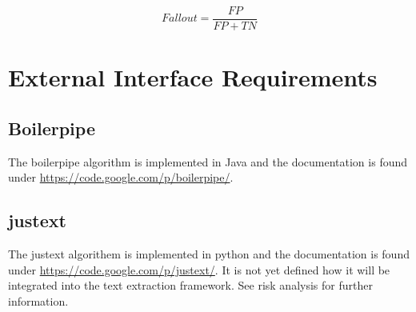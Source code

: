 \begin{equation}
Fallout = \frac{FP}{FP + TN}
\end{equation}




\section{External Interface Requirements}

\subsection{Boilerpipe}

The boilerpipe algorithm is implemented in Java and the documentation is found under
\url{https://code.google.com/p/boilerpipe/}.

\subsection{justext}

The justext algorithem is implemented in python and the documentation is found under \url{https://code.google.com/p/justext/}. It is not yet defined how it will be integrated into the text extraction framework. See risk analysis for further information.


